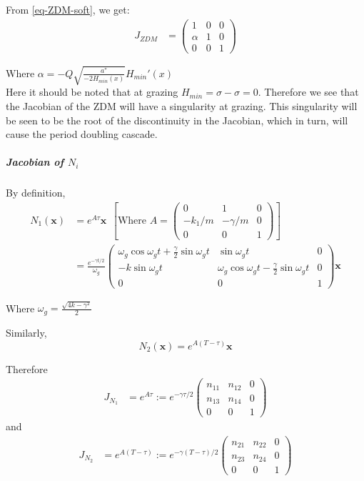 \documentclass{book}
\renewcommand{\(}{\begin{columns}}
\renewcommand{\)}{\end{columns}}
\newcommand{\<}[1]{\begin{column}{#1}}
\renewcommand{\>}{\end{column}}
\newcommand{\bb}[1]{\textbf{#1}}
\newcommand{\mb}[1]{\mathbf{#1}}
\newcommand{\subpara}{\subparagraph}
\begin{document}
From \eqref{eq-ZDM-soft}, we get:
\begin{align}
\label{eq-jacob-soft}
J_{ZDM}&=
\begin{pmatrix}
1 & 0 & 0\\
\alpha & 1 & 0\\
0 & 0 & 1
\end{pmatrix}
\end{align}

Where $\alpha=-Q\sqrt{\frac{a^*}{-2H_{min}(x)}}H_{min}'(x)$\\
Here it should be noted that at grazing 
$H_{min}=\sigma-\sigma=0$.  Therefore we see that the Jacobian of the ZDM will 
have a singularity at grazing.  This singularity will be seen to be the root 
of the discontinuity in the Jacobian, which in turn, will cause the period 
doubling cascade.  

\subpara{Jacobian of  $N_i$\\}

By definition,
\begin{align}
\label{eq-Nmatrix}
N_1(\bb{x})&=e^{A\tau}\bb{x}~~\left[\text{Where }A=
\begin{pmatrix}
0 & 1 & 0\\
-k_1/m & -\gamma/m & 0\\
0 & 0 & 1
\end{pmatrix}\right]
\\
&=\frac{e^{-\gamma t/2}}{\omega_g}
\begin{pmatrix}
\omega_g\cos{\omega_g t}+\frac{\gamma}{2}\sin{\omega_g t} & \sin{\omega_g t} & 0\\
-k\sin{\omega_g t} & \omega_g\cos{\omega_g t}-\frac{\gamma}{2}\sin{\omega_g t} 
& 0\\
0 & 0 & 1
\end{pmatrix}\bb{x}
\end{align}

Where $\omega_g=\frac{\sqrt{4k-\gamma^2}}{2}$



Similarly,
\[
N_2(\mb{x})=e^{A(T-\tau)}\mb{x}
\]

Therefore 
\begin{align}
\label{eq-n1-jacob}
J_{N_1}&=e^{A\tau}
:=e^{-\gamma\tau/2}
\begin{pmatrix}
n_{11} & n_{12} & 0\\
n_{13} & n_{14} & 0\\
0 & 0 & 1
\end{pmatrix}
\end{align}
and
\begin{align}
\label{eq-n2-jacob}
J_{N_2}&=e^{A(T-\tau)}
:=e^{-\gamma(T-\tau)/2}
\begin{pmatrix}
n_{21} & n_{22} & 0\\
n_{23} & n_{24} & 0\\
0 & 0 & 1
\end{pmatrix}
\end{align}
\end{document}
